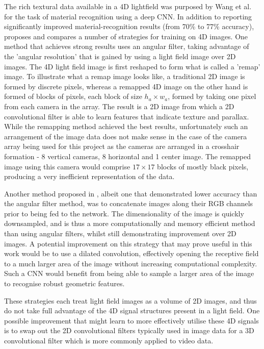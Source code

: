 \documentclass[openany]{book}
\begin{document}
The rich textural data available in a 4D lightfield was purposed by Wang et al. \cite{wang2016lfcnn} for the task of material recognition using a deep CNN. In addition to reporting significantly improved material-recognition results (from 70\% to 77\% accuracy), \cite{wang2016lfcnn} proposes and compares a number of strategies for training on 4D images. One method that achieves strong results uses an angular filter, taking advantage of the 'angular resolution' that is gained by using a light field image over 2D images. The 4D light field image is first reshaped to form what is called a 'remap' image. To illustrate what a remap image looks like, a traditional 2D image is formed by discrete pixels, whereas a remapped 4D image on the other hand is formed of blocks of pixels, each block of size $h_a \times w_a$, formed by taking one pixel from each camera in the array. The result is a 2D image from which a 2D convolutional filter is able to learn features that indicate texture and parallax. While the remapping method achieved the best results, unfortunately such an arrangement of the image data does not make sense in the case of the camera array being used for this project as the cameras are arranged in a crosshair formation - 8 vertical cameras, 8 horizontal and 1 center image. The remapped image using this camera would comprise $17 \times 17$ blocks of mostly black pixels, producing a very inefficient representation of the data. 

Another method proposed in \cite{wang2016lfcnn}, albeit one that demonstrated lower accuracy than the angular filter method, was to concatenate images along their RGB channels prior to being fed to the network. The dimensionality of the image is quickly downsampled, and is thus a more computationally and memory efficient method than using angular filters, whilst still demonstrating improvement over 2D images. A potential improvement on this strategy that may prove useful in this work would be to use a dilated convolution, effectively opening the receptive field to a much larger area of the image without increasing computational complexity. Such a CNN would benefit from being able to sample a larger area of the image to recognise robust geometric features. 

These strategies each treat light field images as a volume of 2D images, and thus do not take full advantage of the 4D signal structures present in a light field. One possible improvement that might learn to more effectively utilise these 4D signals is to swap out the 2D convolutional filters typically used in image data for a 3D convolutional filter which is more commonly applied to video data. 
\end{document}
